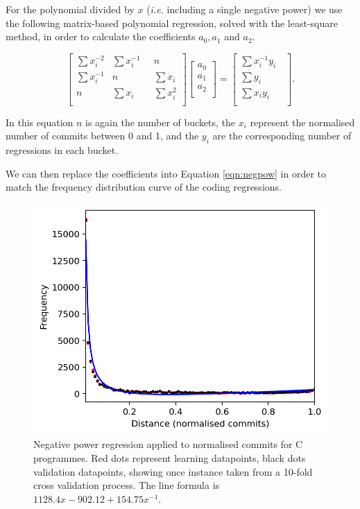 \documentclass[pdflatex, sn-mathphys, referee]{sn-jnl}%
\theoremstyle{thmstyleone}%
\theoremstyle{thmstyletwo}%
\theoremstyle{thmstylethree}%
\def\ie{{\it i.e.}}
\theoremstyle{thmstyleone}
\begin{document}
For the polynomial divided by $x$ (\ie\/ including a single negative power) we use the following matrix-based polynomial regression, solved with the least-square method, in order to calculate the coefficients $a_0, a_1$ and $a_2$.

\begin{equation}
\begin{bmatrix}
\sum x_i^{-2} & \sum x_i^{-1}        & n            \\
\sum x_i^{-1} & n                    & \sum x_i     \\
n             & \sum x_i \phantom{-} & \sum x_i^{2} \\
\end{bmatrix}
\begin{bmatrix}
a_0 \\
a_1 \\
a_2 \\
\end{bmatrix}
=
\begin{bmatrix}
\sum x_i^{-1} y_i        \\
\sum y_i \phantom{x_i -} \\
\sum x_i y_i \phantom{-} \\
\end{bmatrix}.
\end{equation}

In this equation $n$ is again the number of buckets, the $x_i$ represent the normalised number of commits between 0 and 1, and the $y_i$ are the corresponding number of regressions in each bucket.

We can then replace the coefficients into Equation \ref{eqn:negpow} in order to match the frequency distribution curve of the coding regressions.

\begin{figure}[t]
\centering
\includegraphics[width=0.7\columnwidth]{Fig5}%
\caption{\label{fig:c-negpow}Negative power regression applied to normalised commits for C programmes. Red dots represent learning datapoints, black dots validation datapoints, showing once instance taken from a 10-fold cross validation process. The line formula is $1128.4 x - 902.12 + 154.75 x^{-1}$.}
\end{figure}
\end{document}
